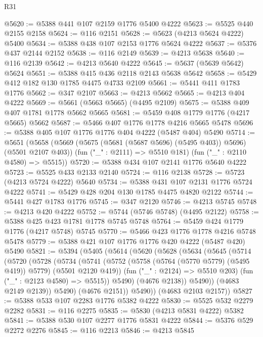 \begin{lexlean}{R31}
\begin{coremodule}
@5620 := @5388 @441 @107 @2159 @1776 @5400 @4222
@5623 := @5525 @440 @2155 @2158
@5624 := @116 @2151
@5628 := @5623 (@4213 @5624 @4222) @5400
@5634 := @5388 @438 @107 @2153 @1776 @5624 @4222
@5637 := @5376 @437 @2144 @2152
@5638 := @116 @2149
@5639 := @4213 @5638
@5640 := @116 @2139
@5642 := @4213 @5640 @4222
@5645 := @5637 (@5639 @5642) @5624
@5651 := @5388 @415 @436 @2118 @2143 @5638 @5642
@5658 := @5429 @412 @182 @130 @1785 @4475 @4733 @2109
@5661 := @5441 @411 @1783 @1776
@5662 := @347 @2107
@5663 := @4213 @5662
@5665 := @4213 @404 @4222
@5669 := @5661 (@5663 @5665) (@4495 @2109)
@5675 := @5388 @409 @407 @1781 @1778 @5662 @5665
@5681 := @5459 @408 @1779 @1776 (@4217 @5665) @5662
@5687 := @5466 @407 @1776 @1778 @4216 @5665 @5478
@5696 := @5388 @405 @107 @1776 @1776 @404 @4222 (@5487 @404) @5490
@5714 := @5651
    (@5658
      (@5669 (@5675 (@5681 (@5687 @5696) (@5495 @403)) @5696) (@5501 @2107 @403))
      (fun ("_" : @2111) => @5510 @181)
      (fun ("_" : @2110 @4580) => @5515))
@5720 := @5388 @434 @107 @2141 @1776 @5640 @4222
@5723 := @5525 @433 @2133 @2140
@5724 := @116 @2138
@5728 := @5723 (@4213 @5724 @4222) @5640
@5734 := @5388 @431 @107 @2131 @1776 @5724 @4222
@5741 := @5429 @428 @204 @130 @1785 @4475 @4820 @2122
@5744 := @5441 @427 @1783 @1776
@5745 := @347 @2120
@5746 := @4213 @5745
@5748 := @4213 @420 @4222
@5752 := @5744 (@5746 @5748) (@4495 @2122)
@5758 := @5388 @425 @423 @1781 @1778 @5745 @5748
@5764 := @5459 @424 @1779 @1776 (@4217 @5748) @5745
@5770 := @5466 @423 @1776 @1778 @4216 @5748 @5478
@5779 := @5388 @421 @107 @1776 @1776 @420 @4222 (@5487 @420) @5490
@5821 := @5394
    (@5405
      (@5614
        (@5620
          (@5628
            (@5634
              (@5645
                (@5714
                  (@5720
                    (@5728
                      (@5734
                        (@5741
                          (@5752
                            (@5758 (@5764 (@5770 @5779) (@5495 @419)) @5779)
                            (@5501 @2120 @419))
                          (fun ("_" : @2124) => @5510 @203)
                          (fun ("_" : @2123 @4580) => @5515))
                        @5490)
                      (@4676 @2138))
                    @5490))
                (@4683 @2149 @2139))
              @5490)
            (@4676 @2151))
          @5490))
      (@4683 @2103 @2157))
@5827 := @5388 @533 @107 @2283 @1776 @5382 @4222
@5830 := @5525 @532 @2279 @2282
@5831 := @116 @2275
@5835 := @5830 (@4213 @5831 @4222) @5382
@5841 := @5388 @530 @107 @2277 @1776 @5831 @4222
@5844 := @5376 @529 @2272 @2276
@5845 := @116 @2213
@5846 := @4213 @5845

\end{coremodule}
\end{lexlean}

